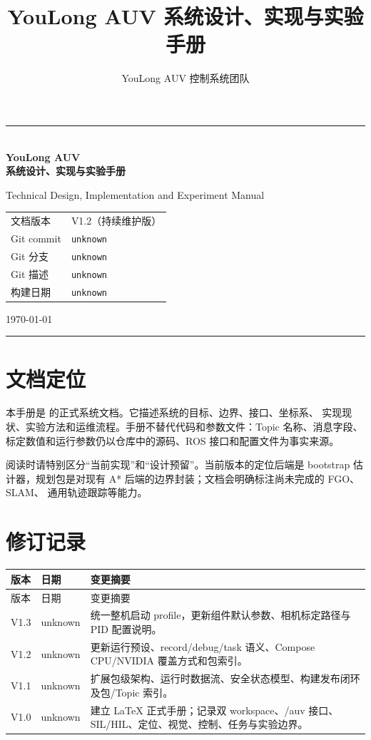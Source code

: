 \documentclass[UTF8,openany,oneside]{ctexbook}
\title{\Huge YouLong AUV 系统设计、实现与实验手册}
\author{YouLong AUV 控制系统团队}
\date{\DocBuildDate}
\providecommand{\DocGitCommit}{unknown}
\providecommand{\DocGitBranch}{unknown}
\providecommand{\DocGitTag}{unknown}
\providecommand{\DocBuildDate}{unknown}
\begin{document}
\frontmatter
\begin{titlepage}
  \centering
  \vspace*{20mm}
  {\color{YoulongBlue}\rule{\textwidth}{1.5pt}}\\[12mm]
  {\Huge\bfseries YouLong AUV\\[4mm]系统设计、实现与实验手册}\par
  \vspace{12mm}
  {\Large Technical Design, Implementation and Experiment Manual}\par
  \vfill
  \begin{tabular}{ll}
    文档版本 & V1.2（持续维护版）\\
    Git commit & \texttt{\DocGitCommit}\\
    Git 分支 & \texttt{\DocGitBranch}\\
    Git 描述 & \texttt{\DocGitTag}\\
    构建日期 & \texttt{\DocBuildDate}\\
  \end{tabular}
  \vfill
  {\large \today}\par
  \vspace{8mm}
  {\color{YoulongBlue}\rule{\textwidth}{1.5pt}}
\end{titlepage}

\chapter*{文档定位}
本手册是 \repo 的正式系统文档。它描述系统的目标、边界、接口、坐标系、
实现现状、实验方法和运维流程。手册不替代代码和参数文件：Topic 名称、消息字段、
标定数值和运行参数仍以仓库中的源码、ROS 接口和配置文件为事实来源。

\begin{infobox}
  阅读时请特别区分“当前实现”和“设计预留”。当前版本的定位后端是 bootstrap
  估计器，规划包是对现有 A* 后端的边界封装；文档会明确标注尚未完成的 FGO、SLAM、
  通用轨迹跟踪等能力。
\end{infobox}

\chapter*{修订记录}
\begin{longtable}{p{}p{}p{}}
  \toprule
  版本 & 日期 & 变更摘要 \\
  \midrule
  \endfirsthead
  \toprule
  版本 & 日期 & 变更摘要 \\
  \midrule
  \endhead
  V1.3 & \DocBuildDate & 统一整机启动 profile，更新组件默认参数、相机标定路径与 PID 配置说明。 \\
  V1.2 & \DocBuildDate & 更新运行预设、record/debug/task 语义、Compose CPU/NVIDIA 覆盖方式和包索引。 \\
  V1.1 & \DocBuildDate & 扩展包级架构、运行时数据流、安全状态模型、构建发布闭环及包/Topic 索引。 \\
  V1.0 & \DocBuildDate & 建立 LaTeX 正式手册；记录双 workspace、/auv 接口、SIL/HIL、定位、视觉、控制、任务与实验边界。 \\
  \bottomrule
\end{longtable}
\end{document}
